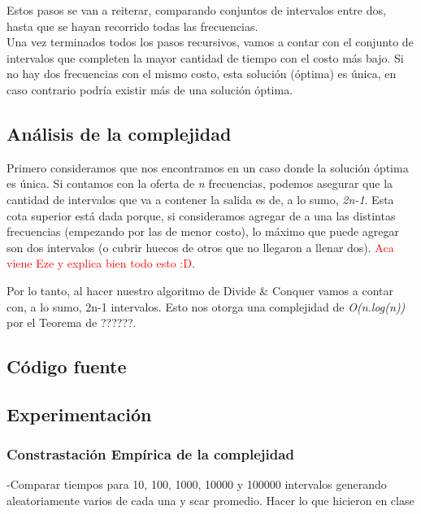 \documentclass[a4paper]{article}
\begin{document}
Estos pasos se van a reiterar, comparando conjuntos de intervalos entre dos, hasta que se hayan recorrido todas las frecuencias.\\


Una vez terminados todos los pasos recursivos, vamos a contar con el conjunto de intervalos que completen la mayor cantidad de tiempo con el costo m\'as bajo. Si no hay dos frecuencias con el mismo costo, esta soluci\'on (\'optima) es \'unica, en caso contrario podr\'ia existir m\'as de una soluci\'on \'optima. \\



\newpage

\subsection{An\'alisis de la complejidad}

Primero consideramos que nos encontramos en un caso donde la soluci\'on \'optima es \'unica. Si contamos con la oferta de \emph{n} frecuencias, podemos asegurar que la cantidad de intervalos que va a contener la salida es de, a lo sumo, \emph{2n-1}. Esta cota superior est\'a dada porque, si consideramos agregar de a una las distintas frecuencias (empezando por las de menor costo), lo m\'aximo que puede agregar son dos intervalos (o cubrir huecos de otros que no llegaron a llenar dos). \textcolor{red}{Aca viene Eze y explica bien todo esto :D}.

Por lo tanto, al hacer nuestro algoritmo de Divide \& Conquer vamos a contar con, a lo sumo, 2n-1 intervalos. Esto nos otorga una complejidad de \emph{O(n.log(n))} por el Teorema de ??????.

\newpage
\subsection{C\'odigo fuente}
\newpage
\subsection{Experimentaci\'on}

\subsubsection{Constrastaci\'on Emp\'irica de la complejidad}
-Comparar tiempos para 10, 100, 1000, 10000 y 100000 intervalos generando aleatoriamente varios de cada una y scar promedio. Hacer lo que hicieron en clase\\
\end{document}
